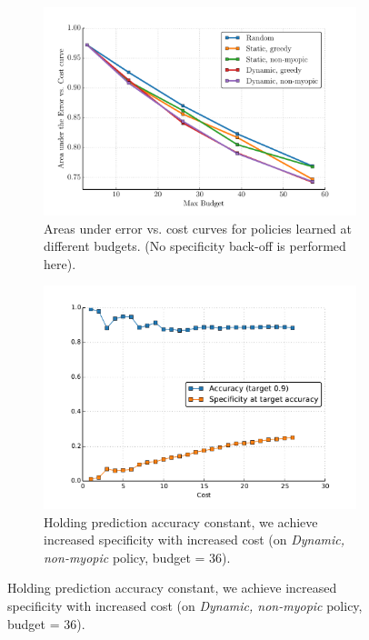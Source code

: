 \begin{figure}[ht]
\centering
    \begin{subfigure}[b]{0.52\textwidth}
            \includegraphics[width=\textwidth]{../../figures/apr11_assembly/_ilsvrc65_auc.pdf}
            \caption{
            Areas under error vs. cost curves for policies learned at different budgets.
            (No specificity back-off is performed here).
            \label{fig:imagenet-a}
            }
    \end{subfigure}\hfill%
    \begin{subfigure}[b]{0.43\textwidth}
            \includegraphics[width=\textwidth]{../../figures/apr11_assembly/ilsvrc65_acc.pdf}
            \caption{
            Holding prediction accuracy constant, we achieve increased specificity with increased cost (on \emph{Dynamic, non-myopic} policy, budget = 36).
}
\end{subfigure}
\end{figure}
